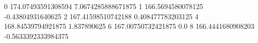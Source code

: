 0 174.07493591308594 7.0674285888671875
1 166.5694580078125 -0.43804931640625
2 167.41598510742188 0.408477783203125
4 168.84539794921875 1.837890625
6 167.00750732421875 0.0
8 166.4441680908203 -0.5633392333984375
